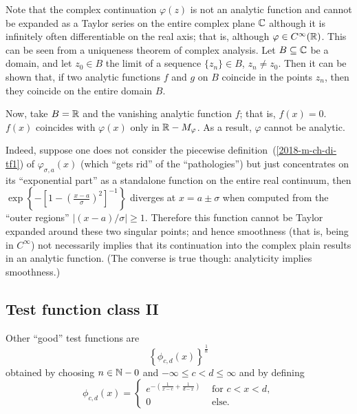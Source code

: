 {Note that the complex continuation
$\varphi (z)$ is not an analytic function and cannot be expanded as a Taylor series on the
entire complex plane ${\Bbb C}$ although it is infinitely often
differentiable on the real axis; that is, although
$\varphi\in C^\infty({\Bbb R})$.
This can be seen from a uniqueness theorem of complex analysis.
Let
 $B\subseteq{\Bbb C}$ be a domain, and
let
$z_0\in B$ the limit of a sequence
$\{z_n\}\in B$, $z_n\ne z_0$.
Then it can be shown that, if two
analytic functions
$f$ and $g$ on $B$  coincide in the points $z_n$,
then they coincide on the entire domain $B$.

Now, take  $B={\Bbb R}$ and
the  vanishing analytic function $f$; that is,
$f(x)=0$.
$f(x)$ coincides with $\varphi (x)$ only in
 ${\Bbb R} - M_\varphi$.
As a result, $\varphi$ cannot be analytic.

Indeed, suppose one does not consider  the piecewise definition~(\ref{2018-m-ch-di-tf1}) of $\varphi_{\sigma, a}(x)$
(which ``gets rid'' of the ``pathologies'')
but just concentrates on its ``exponential part'' as a standalone function on the entire real continuum,
then $\exp \left\{ -\left[ 1 - \left( \frac{x-a}{\sigma }\right)^2 \right]^{-1} \right\}$ diverges at $x=a\pm\sigma$  when
computed from the ``outer regions''  $\left\vert  (x-a)/ \sigma \right\vert \ge 1$.
Therefore this function cannot be Taylor expanded around these two singular points;
and hence smoothness (that is, being in  $C^\infty$)
not necessarily implies that its continuation into the complex plain results in an analytic function. (The converse is true though: analyticity implies smoothness.)
\eproof
}

\subsection{Test function class II}

Other ``good'' test functions are \cite{schwartz}
\begin{equation}
\left\{\phi_{c,d}(x)\right\}^\frac{1}{n}
\end{equation}
obtained by choosing $n\in {\Bbb N} - 0$
and $-\infty \le c<d\le \infty$ and by defining
\begin{equation}
\phi_{c,d}(x)
=
\begin{cases}
e^{-\left( \frac{1}{x-c} + \frac{1}{d-x} \right)} & \textrm{ for }  c<x<d ,   \\
                                                0 & \textrm{ else.}
\end{cases}
\end{equation}

